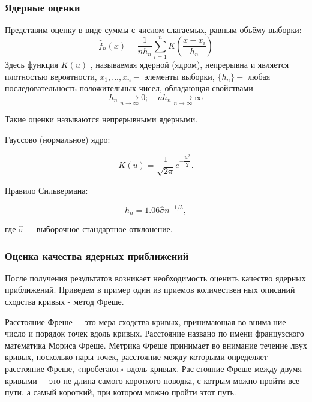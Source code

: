 \documentclass[a4paper]{article}
\begin{document}
        \subsubsection{Ядерные оценки}
            Представим оценку в виде суммы с числом слагаемых, равным объёму выборки:
            \begin{equation}
                \widehat{f}_n(x) = \dfrac{1}{nh_n} \sum\limits_{i=1}^n K(\dfrac{x - x_i}{h_n})
            \end{equation}
            Здесь функция $K(u)$ , называемая ядерной (ядром), непрерывна и является плотностью вероятности, $x_1, ... , x_n - $ элементы выборки, $\{h_n\} - $  любая последовательность положительных чисел, обладающая свойствами
            \begin{equation}
                h_n \underset{n \to \infty}{\longrightarrow} 0; \quad  nh_n \underset{n \to \infty}{\longrightarrow} \infty
            \end{equation}
            
            Такие оценки называются непрерывными ядерными.
            
            Гауссово (нормальное) ядро:
            
            \begin{equation} \label{Gauss_core}
                K(u) = \dfrac{1}{\sqrt{2\pi}}e^{-\dfrac{u^2}{2}}.
            \end{equation}
            
            Правило Сильвермана:
            
            \begin{equation} \label{Silverman_rule}
                h_n = 1.06\widehat{\sigma}n^{-1/5},
            \end{equation}
            
            где $\widehat{\sigma} - $ выборочное стандартное отклонение.

        \subsubsection{Оценка качества ядерных приближений}
        
            После получения результатов возникает необходимость оценить качество
ядерных приближений. Приведем в пример один из приемов количественных описаний сходства кривых - метод Фреше.

            Расстояние Фреше − это мера сходства кривых, принимающая во внимание число и порядок точек вдоль кривых. Расстояние названо по имени
французского математика Мориса Фреше. Метрика Фреше принимает во
внимание течение лвух кривых, посколько пары точек, расстояние между
которыми определяет расстояние Фреше, «пробегают» вдоль кривых. Расстояние Фреше между двумя кривыми − это не длина самого короткого
поводка, с котрым можно пройти все пути, а самый короткий, при котором
можно пройти этот путь.
\end{document}
